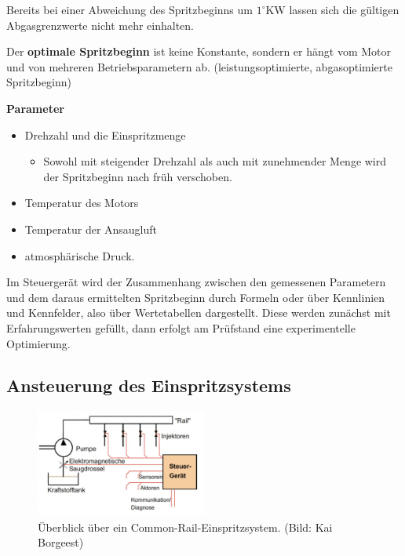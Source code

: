 Bereits bei einer Abweichung des Spritzbeginns um $1^\circ \text{KW}$
lassen sich die gültigen Abgasgrenzwerte nicht mehr einhalten.

Der \textbf{optimale Spritzbeginn} ist keine Konstante, sondern er hängt
vom Motor und von mehreren Betriebsparametern ab. (leistungsoptimierte,
abgasoptimierte Spritzbeginn)

\textbf{Parameter}

\begin{itemize}
\item
  Drehzahl und die Einspritzmenge

  \begin{itemize}
  \item
    Sowohl mit steigender Drehzahl als auch mit zunehmender Menge wird
    der Spritzbeginn nach früh verschoben.
  \end{itemize}
\item
  Temperatur des Motors
\item
  Temperatur der Ansaugluft
\item
  atmosphärische Druck.
\end{itemize}

Im Steuergerät wird der Zusammenhang zwischen den gemessenen Parametern
und dem daraus ermittelten Spritzbeginn durch Formeln oder über
Kennlinien und Kennfelder, also über Wertetabellen dargestellt. Diese
werden zunächst mit Erfahrungswerten gefüllt, dann erfolgt am Prüfstand
eine experimentelle Optimierung.

\newpage

\subsection{Ansteuerung des
Einspritzsystems}\label{ansteuerung-des-einspritzsystems}

\begin{figure}[!ht]%
\centering
\includegraphics[width=0.5\textwidth]{images/EDC/EDC-5.pdf}
\caption{Überblick über ein Common-Rail-Einspritzsystem. (Bild: Kai
Borgeest)}
\end{figure}

